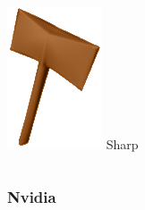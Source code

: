 \begin{frame}
\begin{columns}
\begin{column}[b]{0.22\textwidth}
\begin{center}
				\includegraphics[width=\textwidth]{./img/2_mesh/sharpAxeShaded.png}
				\small{Sharp}
			\end{center}	
		\end{column}
	\end{columns}
\end{frame}	

\begin{frame}\frametitle{Nvidia}
\end{frame}
